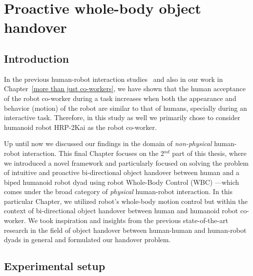 	
{\color{blue}\chapter{Proactive whole-body object handover}\label{handover chapter}}

\section{Introduction}\label{introduction}

In the previous human-robot interaction studies~\cite{huber2008human, strabala2013toward, shibata1995experimental} and also in our work in Chapter~\ref{more than just co-workers}, we have shown that the human acceptance of the robot co-worker during a task increases when both the appearance and behavior (motion) of the robot are similar to that of humans, specially during an interactive task. Therefore, in this study as well we primarily chose to consider humanoid robot HRP-2Kai as the robot co-worker. 

Up until now we discussed our findings in the domain of \textit{non-physical} human-robot interaction. This final Chapter focuses on the 2$^{nd}$ part of this thesis, where we introduced a novel framework and particularly focused on solving the problem of intuitive and proactive bi-directional object handover between human and a biped humanoid robot dyad using robot Whole-Body Control (WBC) ---which comes under the broad category of \textit{physical} human-robot interaction. In this particular Chapter, we utilized robot's whole-body motion control but within the context of bi-directional object handover between human and humanoid robot co-worker. We took inspiration and insights from the previous state-of-the-art research in the field of object handover between human-human and human-robot dyads in general and formulated our handover problem.

\clearpage


\section{Experimental setup}

